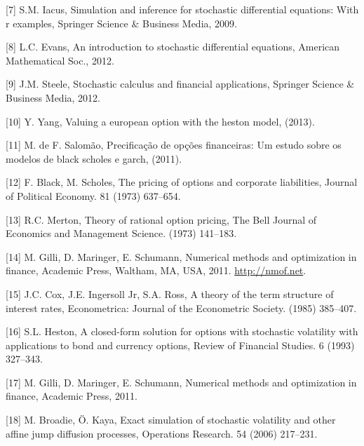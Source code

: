 \documentclass[12pt,twoside]{reedthesis}
\theoremstyle{definition}
\theoremstyle{definition}
\theoremstyle{remark}
\begin{document}
  \hypertarget{ref-iacus2009simulation}{}
  {[}7{]} S.M. Iacus, Simulation and inference for stochastic differential
  equations: With r examples, Springer Science \& Business Media, 2009.
  
  \hypertarget{ref-evans2012introduction}{}
  {[}8{]} L.C. Evans, An introduction to stochastic differential
  equations, American Mathematical Soc., 2012.
  
  \hypertarget{ref-steele2012stochastic}{}
  {[}9{]} J.M. Steele, Stochastic calculus and financial applications,
  Springer Science \& Business Media, 2012.
  
  \hypertarget{ref-yang2013valuing}{}
  {[}10{]} Y. Yang, Valuing a european option with the heston model,
  (2013).
  
  \hypertarget{ref-salomao2011precificaccao}{}
  {[}11{]} M. de F. Salomão, Precificação de opções financeiras: Um estudo
  sobre os modelos de black scholes e garch, (2011).
  
  \hypertarget{ref-black1973pricing}{}
  {[}12{]} F. Black, M. Scholes, The pricing of options and corporate
  liabilities, Journal of Political Economy. 81 (1973) 637--654.
  
  \hypertarget{ref-merton1973theory}{}
  {[}13{]} R.C. Merton, Theory of rational option pricing, The Bell
  Journal of Economics and Management Science. (1973) 141--183.
  
  \hypertarget{ref-nmof}{}
  {[}14{]} M. Gilli, D. Maringer, E. Schumann, Numerical methods and
  optimization in finance, Academic Press, Waltham, MA, USA, 2011.
  \url{http://nmof.net}.
  
  \hypertarget{ref-cox1985theory}{}
  {[}15{]} J.C. Cox, J.E. Ingersoll Jr, S.A. Ross, A theory of the term
  structure of interest rates, Econometrica: Journal of the Econometric
  Society. (1985) 385--407.
  
  \hypertarget{ref-heston1993closed}{}
  {[}16{]} S.L. Heston, A closed-form solution for options with stochastic
  volatility with applications to bond and currency options, Review of
  Financial Studies. 6 (1993) 327--343.
  
  \hypertarget{ref-gilli_numerical_2011}{}
  {[}17{]} M. Gilli, D. Maringer, E. Schumann, Numerical methods and
  optimization in finance, Academic Press, 2011.
  
  \hypertarget{ref-broadie2006exact}{}
  {[}18{]} M. Broadie, Ö. Kaya, Exact simulation of stochastic volatility
  and other affine jump diffusion processes, Operations Research. 54
  (2006) 217--231.


\end{document}
